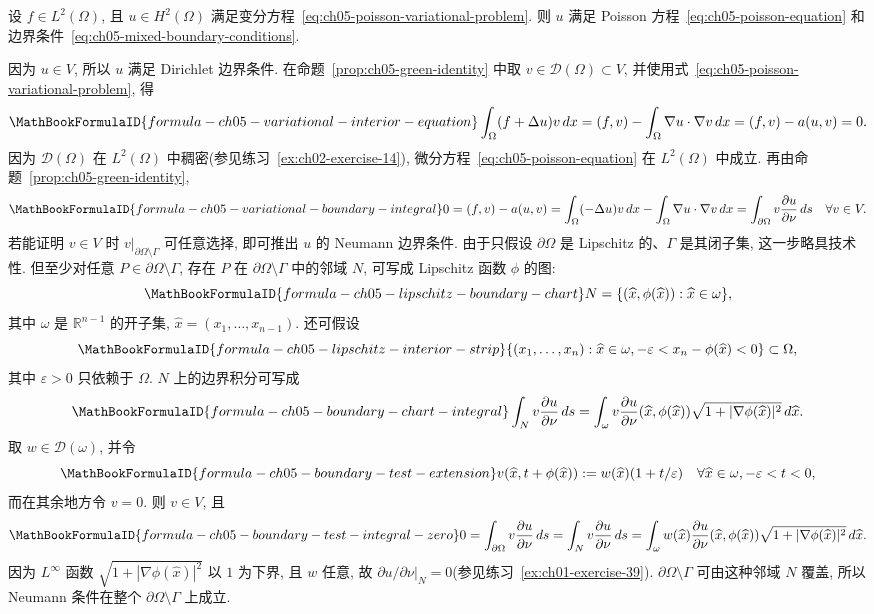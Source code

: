 \begin{Proposition}
\label{prop:ch05-variational-implies-classical}
设 $f\in L^2(\Omega)$, 且 $u\in H^2(\Omega)$ 满足变分方程~\eqref{eq:ch05-poisson-variational-problem}. 则 $u$ 满足 Poisson 方程~\eqref{eq:ch05-poisson-equation} 和边界条件~\eqref{eq:ch05-mixed-boundary-conditions}.
\end{Proposition}
\begin{Proof}
因为 $u\in V$, 所以 $u$ 满足 Dirichlet 边界条件. 在命题~\ref{prop:ch05-green-identity} 中取 $v\in\mathcal D(\Omega)\subset V$, 并使用式~\eqref{eq:ch05-poisson-variational-problem}, 得
\[
\MathBookFormulaID{formula-ch05-variational-interior-equation}
\int_\Omega(f+\Delta u)v\,dx
=(f,v)-\int_\Omega\nabla u\cdot\nabla v\,dx
=(f,v)-a(u,v)=0.
\]
因为 $\mathcal D(\Omega)$ 在 $L^2(\Omega)$ 中稠密(参见练习~\ref{ex:ch02-exercise-14}), 微分方程~\eqref{eq:ch05-poisson-equation} 在 $L^2(\Omega)$ 中成立. 再由命题~\ref{prop:ch05-green-identity},
\[
\MathBookFormulaID{formula-ch05-variational-boundary-integral}
0=(f,v)-a(u,v)
=\int_\Omega(-\Delta u)v\,dx-\int_\Omega\nabla u\cdot\nabla v\,dx
=\int_{\partial\Omega}v\frac{\partial u}{\partial\nu}\,ds
\quad\forall v\in V.
\]
若能证明 $v\in V$ 时 $v|_{\partial\Omega\setminus\Gamma}$ 可任意选择, 即可推出 $u$ 的 Neumann 边界条件. 由于只假设 $\partial\Omega$ 是 Lipschitz 的、$\Gamma$ 是其闭子集, 这一步略具技术性. 但至少对任意 $P\in\partial\Omega\setminus\Gamma$, 存在 $P$ 在 $\partial\Omega\setminus\Gamma$ 中的邻域 $N$, 可写成 Lipschitz 函数 $\phi$ 的图:
\[
\MathBookFormulaID{formula-ch05-lipschitz-boundary-chart}
N=\{(\widehat x,\phi(\widehat x)):\widehat x\in\omega\},
\]
其中 $\omega$ 是 $\mathbb R^{n-1}$ 的开子集, $\widehat x=(x_1,\ldots,x_{n-1})$. 还可假设
\[
\MathBookFormulaID{formula-ch05-lipschitz-interior-strip}
\{(x_1,\ldots,x_n):\widehat x\in\omega,
-\varepsilon<x_n-\phi(\widehat x)<0\}\subset\Omega,
\]
其中 $\varepsilon>0$ 只依赖于 $\Omega$. $N$ 上的边界积分可写成
\[
\MathBookFormulaID{formula-ch05-boundary-chart-integral}
\int_Nv\frac{\partial u}{\partial\nu}\,ds
=\int_\omega v\frac{\partial u}{\partial\nu}(\widehat x,\phi(\widehat x))
\sqrt{1+|\nabla\phi(\widehat x)|^2}\,d\widehat x.
\]
取 $w\in\mathcal D(\omega)$, 并令
\[
\MathBookFormulaID{formula-ch05-boundary-test-extension}
v(\widehat x,t+\phi(\widehat x))
:=w(\widehat x)(1+t/\varepsilon)
\quad\forall\widehat x\in\omega, -\varepsilon<t<0,
\]
而在其余地方令 $v=0$. 则 $v\in V$, 且
\[
\MathBookFormulaID{formula-ch05-boundary-test-integral-zero}
0=\int_{\partial\Omega}v\frac{\partial u}{\partial\nu}\,ds
=\int_Nv\frac{\partial u}{\partial\nu}\,ds
=\int_\omega w(\widehat x)\frac{\partial u}{\partial\nu}
(\widehat x,\phi(\widehat x))\sqrt{1+|\nabla\phi(\widehat x)|^2}\,d\widehat x.
\]
因为 $L^\infty$ 函数 $\sqrt{1+|\nabla\phi(\widehat x)|^2}$ 以 $1$ 为下界, 且 $w$ 任意, 故 $\partial u/\partial\nu|_N=0$(参见练习~\ref{ex:ch01-exercise-39}). $\partial\Omega\setminus\Gamma$ 可由这种邻域 $N$ 覆盖, 所以 Neumann 条件在整个 $\partial\Omega\setminus\Gamma$ 上成立.
\end{Proof}
